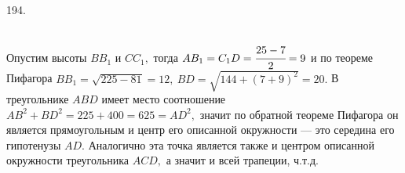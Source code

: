 194. \begin{figure}[ht!]
\end{figure}\\
Опустим высоты $BB_1$ и $CC_1,$ тогда $AB_1=C_1D=\cfrac{25-7}{2}=9$ и по теореме Пифагора $BB_1=\sqrt{225-81}=12,\ BD=\sqrt{144+(7+9)^2}=20.$ В треугольнике $ABD$ имеет место соотношение $AB^2+BD^2=225+400=625=AD^2,$ значит по обратной теореме Пифагора он является прямоугольным и центр его описанной окружности --- это середина его гипотенузы $AD.$ Аналогично эта точка является также и центром описанной окружности треугольника $ACD,$ а значит и всей трапеции, ч.т.д.\newpage\noindent
